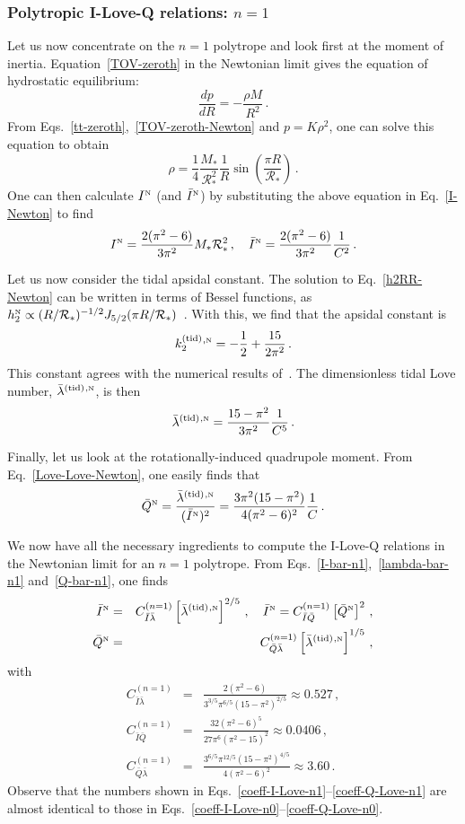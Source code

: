\documentclass[aps,twocolumn,nofootinbib,showpacs,superscriptaddress,hyperref]{revtex4-1}
\newcommand\be{\begin{equation}}
\newcommand\ba{\begin{eqnarray}}
\newcommand\ee{\end{equation}}
\newcommand\ea{\end{eqnarray}}
\newcommand{\nn}{\nonumber}
\newcommand{\NS}{*}
\newcommand{\RNS}{\mathcal{R}_*}
\newcommand{\tid}{\mathrm{(tid)}}
\newcommand{\N}{{\mbox{\tiny N}}}
\newcommand{\Qbar}{\bar{Q}}
\begin{document}
\subsubsection{Polytropic I-Love-Q relations: $n=1$}

Let us now concentrate on the $n=1$ polytrope and look first at the moment of inertia. 
Equation~\eqref{TOV-zeroth} in the Newtonian limit gives the equation of hydrostatic equilibrium:
%
\be
\frac{dp}{dR} = - \frac{\rho M}{R^2}\,.
\label{TOV-zeroth-Newton}
\ee
%
From Eqs.~\eqref{tt-zeroth},~\eqref{TOV-zeroth-Newton} and $p=K \rho^2$, one can solve this equation to obtain 
%
\be
\rho = \frac{1}{4} \frac{M_\NS}{\RNS^2} \frac{1}{R} \sin \left( \frac{\pi R}{\RNS} \right)\,.
\ee
%
One can then calculate $I^\N$ (and $\bar{I}^\N$) by substituting the above equation in Eq.~\eqref{I-Newton} to find
%
\be
I^\N = \frac{2 (\pi^2-6)}{3\pi^2} M_\NS \RNS^2\,, \quad \bar{I}^\N = \frac{2 (\pi^2-6)}{3\pi^2} \frac{1}{C^2}\,.
\label{I-bar-n1}
\ee
%

Let us now consider the tidal apsidal constant. The solution to Eq.~\eqref{h2RR-Newton} can be written in terms of Bessel functions, 
as $h_2^\N \propto (R/\RNS)^{-1/2} J_{5/2} (\pi R/\RNS)$~\cite{hinderer-love,damour-nagar}. With this, we find that the apsidal constant is
%
\be
k_2^\tid{}^{,\N} = -\frac{1}{2} + \frac{15}{2\pi^2}\,.
\ee
% 
This constant agrees with the numerical results of~\cite{brooker-olle}. The dimensionless tidal Love number, $\bar{\lambda}^\tid{}^{,\N}$,
is then
%
\be
\bar{\lambda}^\tid{}^{,\N} = \frac{15-\pi^2}{3\pi^2} \frac{1}{C^5}\,.
\label{lambda-bar-n1}
\ee
% 

Finally, let us look at the rotationally-induced quadrupole moment. From Eq.~\eqref{Love-Love-Newton}, one easily finds that
%
\be
\Qbar^{\N} = \frac{\bar{\lambda}^\tid{}^{,\N}}{(\bar{I}^\N)^2} = \frac{3\pi^2 (15-\pi^2)}{4(\pi^2-6)^2} \frac{1}{C}\,.
\label{Q-bar-n1}
\ee
%

We now have all the necessary ingredients to compute the I-Love-Q relations in the Newtonian limit for an
$n=1$ polytrope. From Eqs.~\eqref{I-bar-n1},~\eqref{lambda-bar-n1} and~\eqref{Q-bar-n1}, one finds 
%
\ba
\bar{I}^\N &=& C_{\bar{I} \bar{\lambda}}^{(n=1)} \left[ \bar{\lambda}^\tid{}^{,\N} \right]^{2/5}\,, \quad \bar{I}^\N = C_{\bar{I} \bar{Q}}^{(n=1)} \left[\Qbar^{\N} \right]^{2}\,, \nn \\ 
\Qbar^{\N} &=& C_{\bar{Q} \bar{\lambda}}^{(n=1)} \left[ \bar{\lambda}^\tid{}^{,\N} \right]^{1/5}\,,
\label{I-Love-Q-n1}
\ea
%
with
%
\ba
\label{coeff-I-Love-n1}
C_{\bar{I} \bar{\lambda}}^{(n=1)} &=& \frac{ 2(\pi^2 -6)}{3^{3/5} \pi^{6/5} (15-\pi^2)^{2/5}} \approx 0.527\,, \\
C_{\bar{I} \bar{Q}}^{(n=1)} &=& \frac{32 (\pi^2-6)^5}{27 \pi^6 (\pi^2 -15)^2} \approx 0.0406\,, \\
\label{coeff-Q-Love-n1}
C_{\bar{Q} \bar{\lambda}}^{(n=1)} &=& \frac{3^{6/5} \pi^{12/5} (15-\pi^2)^{4/5}}{4(\pi^2-6)^2} \approx 3.60\,. 
\ea
%
Observe that the numbers shown in Eqs.~\eqref{coeff-I-Love-n1}--\eqref{coeff-Q-Love-n1} are almost identical to those in Eqs.~\eqref{coeff-I-Love-n0}--\eqref{coeff-Q-Love-n0}.
\end{document}
